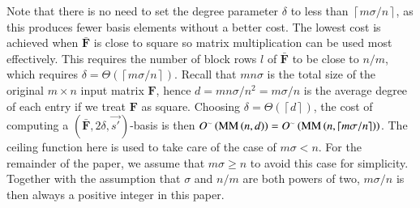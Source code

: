 Note that there is no need to set the degree parameter $\delta$ to
less than $\left\lceil m\sigma/n\right\rceil $, as this produces
fewer basis elements without a better cost. The lowest cost is achieved
when $\bar{\mathbf{F}}$ is close to square so matrix multiplication
can be used most effectively. This requires the number of block rows
$l$ of $\bar{\mathbf{F}}$ to be close to $n/m$, which requires
$\delta=\Theta\left(\left\lceil m\sigma/n\right\rceil \right)$. Recall
that $mn\sigma$ is the total size of the original $m\times n$ input
matrix $\mathbf{F}$, hence $d=mn\sigma/n^{2}=m\sigma/n$ is the average
degree of each entry if we treat $\mathbf{F}$ as square. Choosing
$\delta=\Theta\left(\left\lceil d\right\rceil \right)$, the cost
of computing a $({\bar{\mathbf{F}}},2\delta,\vec{s'})$-basis is then
$O^{\sim}\left(\MM\left(n,d\right)\right)=O^{\sim}\left(\MM\left(n,\left\lceil m\sigma/n\right\rceil \right)\right)$.
The ceiling function here is used to take care of the case of $m\sigma<n$.
For the remainder of the paper, we assume that $m\sigma\ge n$ to
avoid this case for simplicity. Together with the assumption that
$\sigma$ and $n/m$ are both powers of two, $m\sigma/n$ is then
always a positive integer in this paper.


